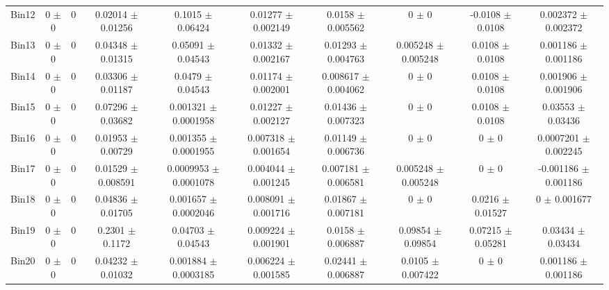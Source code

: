 \begin{tabular}{@{\extracolsep{4pt}}lccccccccc@{}}
     Bin12 & 0 $\pm$ 0 & 0 & 0.02014 $\pm$ 0.01256 & 0.1015 $\pm$ 0.06424 & 0.01277 $\pm$ 0.002149 & 0.0158 $\pm$ 0.005562 & 0 $\pm$ 0 & -0.0108 $\pm$ 0.0108 & 0.002372 $\pm$ 0.002372 \\ 
     Bin13 & 0 $\pm$ 0 & 0 & 0.04348 $\pm$ 0.01315 & 0.05091 $\pm$ 0.04543 & 0.01332 $\pm$ 0.002167 & 0.01293 $\pm$ 0.004763 & 0.005248 $\pm$ 0.005248 & 0.0108 $\pm$ 0.0108 & 0.001186 $\pm$ 0.001186 \\ 
     Bin14 & 0 $\pm$ 0 & 0 & 0.03306 $\pm$ 0.01187 & 0.0479 $\pm$ 0.04543 & 0.01174 $\pm$ 0.002001 & 0.008617 $\pm$ 0.004062 & 0 $\pm$ 0 & 0.0108 $\pm$ 0.0108 & 0.001906 $\pm$ 0.001906 \\ 
     Bin15 & 0 $\pm$ 0 & 0 & 0.07296 $\pm$ 0.03682 & 0.001321 $\pm$ 0.0001958 & 0.01227 $\pm$ 0.002127 & 0.01436 $\pm$ 0.007323 & 0 $\pm$ 0 & 0.0108 $\pm$ 0.0108 & 0.03553 $\pm$ 0.03436 \\ 
     Bin16 & 0 $\pm$ 0 & 0 & 0.01953 $\pm$ 0.00729 & 0.001355 $\pm$ 0.0001955 & 0.007318 $\pm$ 0.001654 & 0.01149 $\pm$ 0.006736 & 0 $\pm$ 0 & 0 $\pm$ 0 & 0.0007201 $\pm$ 0.002245 \\ 
     Bin17 & 0 $\pm$ 0 & 0 & 0.01529 $\pm$ 0.008591 & 0.0009953 $\pm$ 0.0001078 & 0.004044 $\pm$ 0.001245 & 0.007181 $\pm$ 0.006581 & 0.005248 $\pm$ 0.005248 & 0 $\pm$ 0 & -0.001186 $\pm$ 0.001186 \\ 
     Bin18 & 0 $\pm$ 0 & 0 & 0.04836 $\pm$ 0.01705 & 0.001657 $\pm$ 0.0002046 & 0.008091 $\pm$ 0.001716 & 0.01867 $\pm$ 0.007181 & 0 $\pm$ 0 & 0.0216 $\pm$ 0.01527 & 0 $\pm$ 0.001677 \\ 
     Bin19 & 0 $\pm$ 0 & 0 & 0.2301 $\pm$ 0.1172 & 0.04703 $\pm$ 0.04543 & 0.009224 $\pm$ 0.001901 & 0.0158 $\pm$ 0.006887 & 0.09854 $\pm$ 0.09854 & 0.07215 $\pm$ 0.05281 & 0.03434 $\pm$ 0.03434 \\ 
     Bin20 & 0 $\pm$ 0 & 0 & 0.04232 $\pm$ 0.01032 & 0.001884 $\pm$ 0.0003185 & 0.006224 $\pm$ 0.001585 & 0.02441 $\pm$ 0.006887 & 0.0105 $\pm$ 0.007422 & 0 $\pm$ 0 & 0.001186 $\pm$ 0.001186 \\ 
\hline\hline
  \end{tabular}
